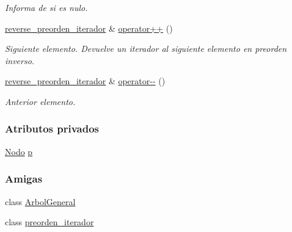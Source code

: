 \begin{DoxyCompactItemize}
\begin{DoxyCompactList}\small\item\em Informa de si es nulo. \end{DoxyCompactList}\item 
\hyperlink{classArbolGeneral_1_1reverse__preorden__iterador}{reverse\-\_\-preorden\-\_\-iterador} \& \hyperlink{classArbolGeneral_1_1reverse__preorden__iterador_a46a546c134ae2d7fe7bc41e16227eb1f}{operator++} ()
\begin{DoxyCompactList}\small\item\em Siguiente elemento.  Devuelve un iterador al siguiente elemento en preorden inverso. \end{DoxyCompactList}\item 
\hyperlink{classArbolGeneral_1_1reverse__preorden__iterador}{reverse\-\_\-preorden\-\_\-iterador} \& \hyperlink{classArbolGeneral_1_1reverse__preorden__iterador_abe501ae99cd71b927e21f882ec4bfec6}{operator-\/-\/} ()
\begin{DoxyCompactList}\small\item\em Anterior elemento. \end{DoxyCompactList}\end{DoxyCompactItemize}
\subsubsection*{Atributos privados}
\begin{DoxyCompactItemize}
\item 
\hyperlink{classArbolGeneral_a12cc1b74a9095d89bc7334290d332f7a}{Nodo} \hyperlink{classArbolGeneral_1_1reverse__preorden__iterador_a002862fdee453a84b037e5dd26c071a2}{p}
\end{DoxyCompactItemize}
\subsubsection*{Amigas}
\begin{DoxyCompactItemize}
\item 
class \hyperlink{classArbolGeneral_1_1reverse__preorden__iterador_a9c06e31b7c3e0d4ee5b03003d32935a5}{Arbol\-General}
\item 
class \hyperlink{classArbolGeneral_1_1reverse__preorden__iterador_a4aa0da8bfbc320a8daff98451ee65b6c}{preorden\-\_\-iterador}
\end{DoxyCompactItemize}


